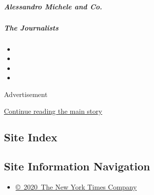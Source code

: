 \href{/interactive/2020/04/13/t-magazine/maria-cornejo-olivier-rousteing-telfar-clemens-alessandro-michele.html\#alessandro-michele-and-co}{}

\hypertarget{alessandro-michele-and-co}{%
\subparagraph{Alessandro Michele and
Co.}\label{alessandro-michele-and-co}}

\href{/interactive/2020/04/13/t-magazine/foreign-correspondents.html}{}

\hypertarget{the-journalists}{%
\subparagraph{The Journalists}\label{the-journalists}}

\begin{itemize}
\item
\item
\item
\item
\end{itemize}

Advertisement

\protect\hyperlink{after-bottom}{Continue reading the main story}

\hypertarget{site-index}{%
\subsection{Site Index}\label{site-index}}

\hypertarget{site-information-navigation}{%
\subsection{Site Information
Navigation}\label{site-information-navigation}}

\begin{itemize}
\tightlist
\item
  \href{https://help.nytimes.com/hc/en-us/articles/115014792127-Copyright-notice}{©~2020~The
  New York Times Company}
\end{itemize}

